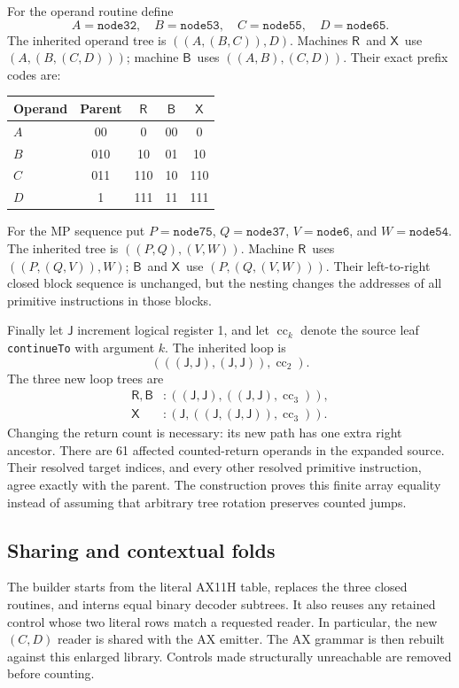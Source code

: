 \documentclass[11pt]{article}
\newcommand{\cc}{\operatorname{cc}}
\newcommand{\J}{\ensuremath{\mathsf J}}
\newcommand{\R}{\ensuremath{\mathsf R}}
\newcommand{\B}{\ensuremath{\mathsf B}}
\newcommand{\X}{\ensuremath{\mathsf X}}
\newcommand{\code}[1]{\texttt{#1}}
\begin{document}
For the operand routine define
\[
 A=\code{node32},\quad B=\code{node53},\quad
 C=\code{node55},\quad D=\code{node65}.
\]
The inherited operand tree is $((A,(B,C)),D)$. Machines \R\ and \X\
use $(A,(B,(C,D)))$; machine \B\ uses $((A,B),(C,D))$.
Their exact prefix codes are:
\begin{center}
\begin{tabular}{lcccc}
\toprule
Operand & Parent & \R & \B & \X\\\midrule
$A$ & 00 & 0 & 00 & 0\\
$B$ & 010 & 10 & 01 & 10\\
$C$ & 011 & 110 & 10 & 110\\
$D$ & 1 & 111 & 11 & 111\\\bottomrule
\end{tabular}
\end{center}

For the MP sequence put $P=\code{node75}$, $Q=\code{node37}$,
$V=\code{node6}$, and $W=\code{node54}$. The inherited tree is
$((P,Q),(V,W))$. Machine \R\ uses $((P,(Q,V)),W)$; \B\ and \X\
use $(P,(Q,(V,W)))$. Their left-to-right closed block sequence is
unchanged, but the nesting changes the addresses of all primitive
instructions in those blocks.

Finally let $\J$ increment logical register 1, and let $\cc_k$ denote
the source leaf \code{continueTo} with argument $k$. The inherited
loop is
\[
 (((\J,\J),(\J,\J)),\cc_2).
\]
The three new loop trees are
\begin{align*}
 \R,\B &: ((\J,\J),((\J,\J),\cc_3)),\\
 \X &: (\J,((\J,(\J,\J)),\cc_3)).
\end{align*}
Changing the return count is necessary: its new path has one extra
right ancestor. There are 61 affected counted-return operands in the
expanded source. Their resolved target indices, and every other
resolved primitive instruction, agree exactly with the parent.
The construction proves this finite array equality instead of assuming
that arbitrary tree rotation preserves counted jumps.

\subsection{Sharing and contextual folds}

The builder starts from the literal AX11H table, replaces the three
closed routines, and interns equal binary decoder subtrees. It also
reuses any retained control whose two literal rows match a requested
reader. In particular, the new $(C,D)$ reader is shared with the AX
emitter. The AX grammar is then rebuilt against this enlarged library.
Controls made structurally unreachable are removed before counting.
\end{document}

